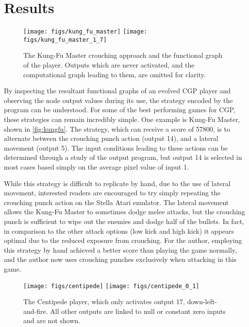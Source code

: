 \documentclass[sigconf,screen]{acmart}\settopmatter{printfolios=true,printacmref=false}
\begin{document}
 \section{Results}
\label{sec:results}



\begin{figure}[h]
  \texttt{[image: figs/kung\_fu\_master]}
  \texttt{[image: figs/kung\_fu\_master\_1\_7]}
  \caption{The Kung-Fu Master crouching approach and the functional graph of the
    player. Outputs which are never activated, and the computational graph
    leading to them, are omitted for clarity.}
  \label{fig:kungfu}
\end{figure}

By inspecting the resultant functional graphs of an evolved CGP player and
observing the node output values during its use, the strategy encoded by the
program can be understood. For some of the best performing games for CGP, these
strategies can remain incredibly simple. One example is Kung-Fu Master, shown in
\autoref{fig:kungfu}. The strategy, which can receive a score of 57800, is to
alternate between the crouching punch action (output 14), and a lateral movement
(output 5). The input conditions leading to these actions can be determined
through a study of the output program, but output 14 is selected in most cases
based simply on the average pixel value of input 1.

While this strategy is difficult to replicate by hand, due to the use of lateral
movement, interested readers are encouraged to try simply repeating the
crouching punch action on the Stella Atari emulator. The lateral movement allows
the Kung-Fu Master to sometimes dodge melee attacks, but the crouching punch is
sufficient to wipe out the enemies and dodge half of the bullets. In fact, in
comparison to the other attack options (low kick and high kick) it appears
optimal due to the reduced exposure from crouching. For the author, employing
this strategy by hand achieved a better score than playing the game normally,
and the author now uses crouching punches exclusively when attacking in this
game.

\begin{figure}[h]
  \texttt{[image: figs/centipede]}
  \texttt{[image: figs/centipede\_0\_1]}
  \caption{The Centipede player, which only activates output 17,
    down-left-and-fire. All other outputs are linked to null or constant zero
    inputs and are not shown.}
  \label{fig:centipede}
\end{figure}
\end{document}
